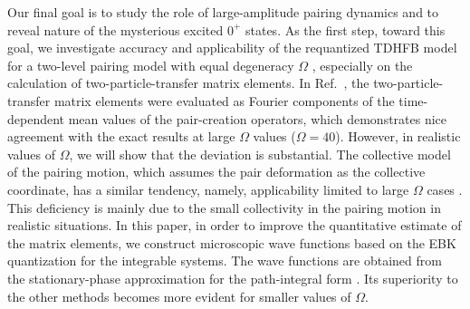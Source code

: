 \documentclass[%
superscriptaddress,
preprint,
showpacs,
nofootinbib,
amsmath,amssymb,
aps,
prc,
floatfix ]%
{revtex4-1}
\begin{document}
Our final goal is to study the role of large-amplitude pairing dynamics
and to reveal nature of the mysterious excited $0^+$ states.
As the first step, toward this goal, we investigate accuracy and
applicability of the requantized TDHFB model for a two-level pairing model
with equal degeneracy $\Omega$ \cite{HF60},
especially on the calculation of two-particle-transfer matrix elements.
In Ref.~\cite{CDS84},
the two-particle-transfer matrix elements were evaluated as
Fourier components of the time-dependent mean values of the pair-creation operators,
which demonstrates nice agreement with the exact results at
large $\Omega$ values ($\Omega=40$).
However, in realistic values of $\Omega$, we will show that
the deviation is substantial.
The collective model of the pairing motion, which assumes the pair deformation
as the collective coordinate, has a similar tendency, namely, 
applicability limited to large $\Omega$ cases \cite{BBPK70}.
This deficiency is mainly due to the small collectivity in the pairing motion
in realistic situations.
In this paper, in order to improve the quantitative estimate of the matrix
elements, we construct microscopic wave functions
based on the EBK quantization for the integrable systems.
The wave functions are obtained
from the stationary-phase approximation for the path-integral form \cite{SM88}.
Its superiority to the other methods
becomes more evident for smaller values of $\Omega$.

\end{document}
